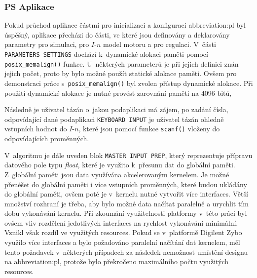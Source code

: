 \documentclass[a4paper, twoside, 11pt]{article}
\begin{document}
		\subsubsection{PS Aplikace}
			Pokud průchod aplikace částmi pro inicializaci a konfiguraci \gls{abbreviation:pl} byl úspěšný, aplikace přecházi do části, ve které jsou definovány a deklarovány parametry pro simulaci, pro $I$-$n$ model motoru a pro regulaci. V~části \texttt{PARAMETERS SETTINGS} dochází k~dynamické alokaci paměti pomocí \texttt{posix\_memalign()} funkce. U~některých parameterů je při jejich definici znán jejich počet, proto by bylo možné použít statické alokace paměti. Ovšem pro demonstraci práce s~\texttt{posix\_memalign()} byl zvolen přístup dynamické alokace. Při použití dynamické alokace je nutné provést zarovnání paměti na 4096 bitů, \par
			Následně je uživatel tázán o~jakou podaplikaci má zájem, po zadání čísla, odpovídající dané podaplikaci \texttt{KEYBOARD INPUT} je uživatel tázán ohledně vstupních hodnot do $I$-$n$, které jsou pomocí funkce \texttt{scanf()} vloženy do odpovídajících proměnných.\par
			V~algoritmu je dále uveden blok \texttt{MASTER INPUT PREP}, který reprezentuje přípravu datového pole typu \textit{float}, které je využito k~přesunu dat do globální paměti. Z~globální paměti jsou data využívána akcelerovaným kernelem. Je možné přenéšet do globální paměti i více vstupních proměnných, které budou ukládány do globální paměti, ovšem poté je v~kernelu nutné vytvořit více interfaces. Větší množství rozhraní je třeba, aby bylo možné data načítat paralelně a urychlit tím dobu vykonávání kernelu. Při zkoumání využitelnosti platformy v~této práci byl ovšem vliv rozdělení jedotlivých interfaces na rychlost vykonávání minimální. Vznikl však rozdíl ve využitých resources. Pokud se v~platformě Digilent Zybo využilo více interfaces a bylo požadováno paralelní načítání dat kernelem, měl tento požadavek v~některých případech za následek nemožnost umístění designu na \gls{abbreviation:pl}, protože bylo překročeno maximálního počtu využitých resources.\par
			
\end{document}
